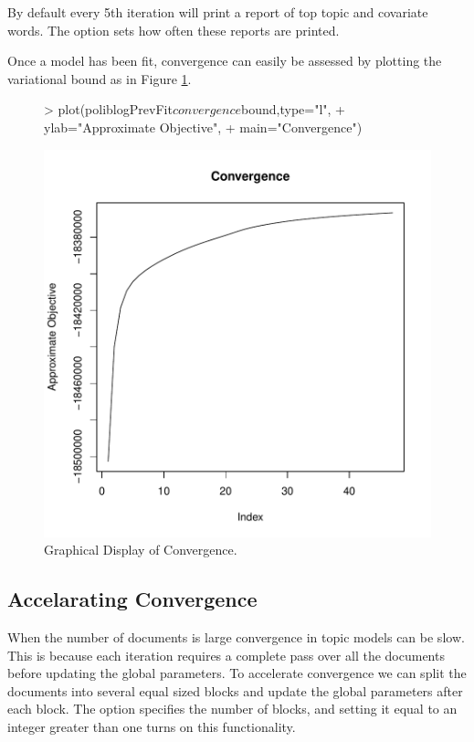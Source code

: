 \documentclass[nojss]{jss}
\begin{document}
By default every 5th iteration will print a report of top topic and covariate words.  The  option sets how often these reports are printed.

Once a model has been fit, convergence can easily be assessed by plotting the variational bound as in Figure \ref{fig:converge}. 

\begin{figure}
\begin{center}
\begin{Schunk}
\begin{Sinput}
> plot(poliblogPrevFit$convergence$bound,type="l", 
+      ylab="Approximate Objective",
+      main="Convergence")
\end{Sinput}
\end{Schunk}
\includegraphics{stmVignette-026}
\caption{Graphical Display of Convergence.}
\label{fig:converge}
\end{center}
\end{figure}

\subsection{Accelarating Convergence}
When the number of documents is large convergence in topic models can be slow.  This is because each iteration requires a complete pass over all the documents before updating the global parameters.  To accelerate convergence we can split the documents into several equal sized blocks and update the global parameters after each block.  The option  specifies the number of blocks, and setting it equal to an integer greater than one turns on this functionality. 
\end{document}
